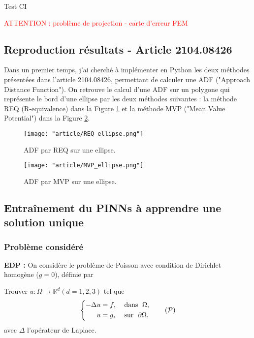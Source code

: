 \graphicspath{{weeks/images/week_4/}}

Test CI

\textcolor{red}{ATTENTION : problème de projection - carte d'erreur FEM}

\subsection{Reproduction résultats - Article 2104.08426}

Dans un premier temps, j'ai cherché à implémenter en Python les deux méthodes présentées dans l'article 2104.08426, permettant de calculer une ADF ("Approach Distance Function"). On retrouve le calcul d'une ADF sur un polygone qui représente le bord d'une ellipse par les deux méthodes suivantes :  la méthode REQ (R-equivalence) dans la Figure \ref{REQ} et la méthode MVP ("Mean Value Potential") dans la Figure \ref{MVP}.

\begin{minipage}{0.38\linewidth}
	\begin{figure}[H]
		\centering
		\texttt{[image: "article/REQ\_ellipse.png"]}
		\caption{ADF par REQ sur une ellipse.}
		\label{REQ}
	\end{figure}
\end{minipage}
\begin{minipage}{0.58\linewidth}
	\begin{figure}[H]
		\centering
		\texttt{[image: "article/MVP\_ellipse.png"]}
		\caption{ADF par MVP sur une ellipse.}
		\label{MVP}
	\end{figure}
\end{minipage}

\subsection{Entraînement du PINNs à apprendre une solution unique}

\subsubsection{Problème considéré}

\textbf{EDP :} On considère le problème de Poisson avec condition de Dirichlet homogène ($g=0$), définie par

Trouver $u : \Omega \rightarrow \mathbb{R}^d (d=1,2,3)$ tel que
\begin{equation}
	\left\{
	\begin{aligned}
		-\Delta u &= f, \; &&\text{dans } \; \Omega, \\
		u&=g, \; &&\text{sur } \; \partial\Omega,
	\end{aligned}
	\right. \tag{$\mathcal{P}$} \label{pb_initial}
\end{equation}
avec $\Delta$ l'opérateur de Laplace.

